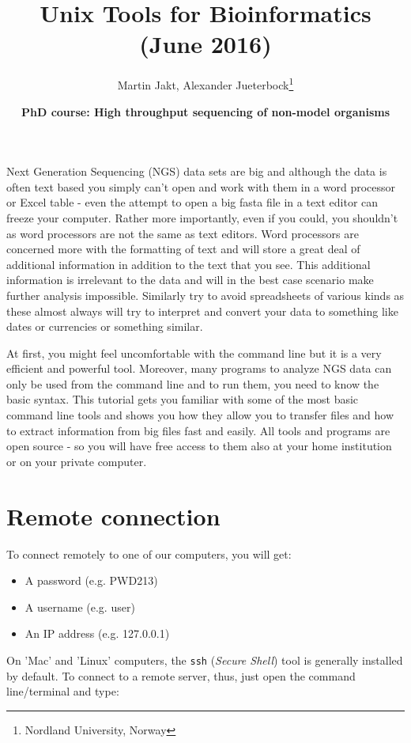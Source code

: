 \documentclass[11pt]{article}
\author{Martin Jakt, Alexander Jueterbock\thanks{Nordland University, Norway}}
\date{\textbf{PhD course: High throughput sequencing of non-model organisms}}
\title{\textbf{Unix Tools for Bioinformatics} (June 2016)}
\begin{document}
\maketitle
\tableofcontents




Next Generation Sequencing (NGS) data sets are big and although the data is
often text based you
simply can't open and work with them in a word processor or Excel
table - even the attempt to open a big fasta file in a text editor can
freeze your computer. Rather more importantly, even if you could, you
shouldn't as word processors are not the same as text editors. Word
processors are concerned more with the formatting of text and will store a
great deal of additional information in addition to the text that you
see. This additional information is irrelevant to the data and will in the
best case scenario make further analysis impossible. Similarly try to avoid
spreadsheets of various kinds as these almost always will try to interpret
and convert your data to something like dates or currencies or something similar.

At first, you might feel uncomfortable with the
command line but it is a very efficient and powerful tool. Moreover,
many programs to analyze NGS data can only be used from the command line and to
run them, you need to know the basic syntax. This tutorial gets you
familiar with some of the most basic command line tools and shows
you how they allow you to transfer files and how to extract
information from big files fast and easily. All tools and programs are
open source - so you will have free access to them also at your home
institution or on your private computer.


\section{Remote connection}
\label{sec-1}
To connect remotely to one of our computers, you will get:

\begin{itemize}
\item A password (e.g. PWD213)
\item A username (e.g. user)
\item An IP address (e.g. 127.0.0.1)
\end{itemize}

On 'Mac' and 'Linux' computers, the \texttt{ssh} (\emph{Secure Shell}) tool is
generally installed by default. To connect to a remote server, thus,
just open the command line/terminal and type:
\end{document}
